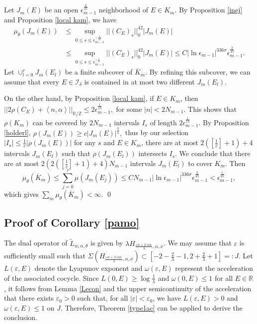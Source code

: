\documentclass[11pt]{amsart}
\theoremstyle{remark}
\theoremstyle{definition}
\begin{document}
Let $J_{m}(E)$  be an open $\epsilon_{m-1}^{\frac{2}{45}}$  neighborhood of $E\in K_m$. By Proposition \ref{inej} and Proposition \ref{local kam}, we have
\begin{equation*}
\begin{split}
\mu_{\theta}(J_m(E))&\le \sup_{0\le s\le\epsilon_{m-1}^{-\frac{2}{45}}}||(C_E)_s||_0^{42}|J_m(E)|\\&\le\sup_{0\le s\le\epsilon_{m-1}^{-\frac{1}{8}}}||(C_E)_s||_0^{42}|J_m(E)|\le C|\ln\epsilon_{m-1}|^{336\sigma}\epsilon_{m-1}^{\frac{2}{45}}.
\end{split}
\end{equation*}
Let $\cup_{l=0}^rJ_m(E_l)$ be a finite subcover of $\overline{K}_m$. By refining this subcover, we can assume that every $E\in \mathcal{I}_\delta$ is contained in at most two different $J_m(E_l)$. 

On the other hand, by Proposition \ref{local kam}, if $E\in K_m$, then
$||  2\rho(C_E)+\left<n,  \alpha\right>||_{\mathbb{R/Z}}\le 2\epsilon_{m-1}^{\frac{1}{15}},$
for some $|n|<2N_{m-1}$.
This shows that $ \rho({K}_{m})$ can be covered by $2N_{m-1}$  intervals $I_{s}$ of length  $2 \epsilon_{m-1}^{\frac{1}{15}}$.
By Proposition  \ref{holderl},
$\rho(J_m(E))\ge c|J_m(E)|^{\frac{3}{2}},$
thus  by our selection $|I_{s}|\leq \frac{1}{c}| \rho(J_{m}(E))|$   for any $s$
and $E\in{K}_{m}$, there are at most $2([\frac{1}{c}]+1)+4$ intervals $J_m(E_l)$ such that $ \rho(J_m(E_l))$  intersects $I_{s}$.
We conclude that there are at most $2(2([\frac{1}{c}]+1)+4)N_{m-1}$
intervals $J_m(E_l)$ to cover $K_m$. Then 
\begin{equation*}
\mu_{\theta}(\overline{K}_{m})\leq \sum_{j=0}^{r}\mu(J_{m}(E_{j}))\le CN_{m-1}|\ln\epsilon_{m-1}|^{
336\sigma}\epsilon_{m-1}^{\frac{2}{45}}< \epsilon_{m-1}^{\frac{1}{45}},
\end{equation*}
which gives $\sum_m \mu_{\theta}(\overline{K}_{m})<\infty$. 
\qed
\subsection{Proof of Corollary \ref{pamo}}
The dual operator of $ \tilde{L}_{w,\alpha,\theta} $ is given by $ \lambda H_{\frac{\varepsilon w + 2\cos}{\lambda}, \alpha, x} $. We may assume that $ \varepsilon $ is sufficiently small such that $ \Sigma\left(H_{\frac{\varepsilon w + 2\cos}{\lambda}, \alpha, x}\right) \subset [-2 - \frac{2}{\lambda} - 1, 2 + \frac{2}{\lambda} + 1] =: J $. Let $ L(\varepsilon, E) $ denote the Lyapunov exponent and $ \omega(\varepsilon, E) $ represent the acceleration of the associated cocycle. Since $ L(0, E) \geq \log\frac{1}{\lambda} $ and $ \omega(0, E) \leq 1 $ for all $ E \in \mathbb{R} $, it follows from Lemma \ref{Lecon} and the upper semicontinuity of the acceleration \cite{avila} that there exists $ \varepsilon_0 > 0 $ such that, for all $ |\varepsilon| < \varepsilon_0 $, we have $ L(\varepsilon, E) > 0 $ and $ \omega(\varepsilon, E) \leq 1 $ on $ J $. Therefore, Theorem \ref{type1ac} can be applied to derive the conclusion.
\end{document}
